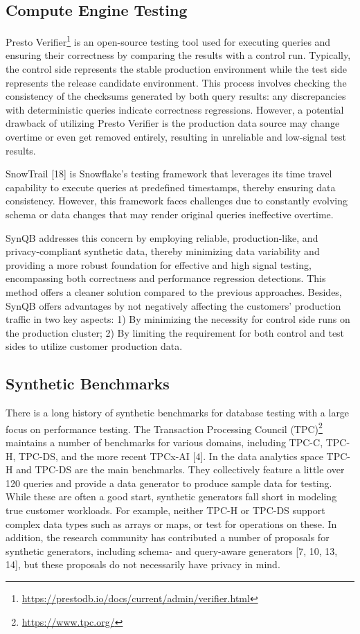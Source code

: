 \documentclass[11pt]{article}
\begin{document}
\subsection{Compute Engine Testing}
Presto Verifier\footnote{\url{https://prestodb.io/docs/current/admin/verifier.html}}
is an open-source testing tool used for executing
queries and ensuring their correctness by comparing the results
with a control run. Typically, the control side represents the stable
production environment while the test side represents the release
candidate environment. This process involves checking the consistency
of the checksums generated by both query results: any
discrepancies with deterministic queries indicate correctness regressions.
However, a potential drawback of utilizing Presto Verifier
is the production data source may change overtime or even get
removed entirely, resulting in unreliable and low-signal test results.

SnowTrail [18] is Snowflake's testing framework that leverages
its time travel capability to execute queries at predefined timestamps,
thereby ensuring data consistency. However, this framework
faces challenges due to constantly evolving schema or data changes
that may render original queries ineffective overtime.

SynQB addresses this concern by employing reliable, production-like,
and privacy-compliant synthetic data, thereby minimizing data
variability and providing a more robust foundation for effective
and high signal testing, encompassing both correctness and performance
regression detections. This method offers a cleaner solution
compared to the previous approaches. Besides, SynQB offers advantages
by not negatively affecting the customers' production traffic
in two key aspects: 1) By minimizing the necessity for control side
runs on the production cluster; 2) By limiting the requirement for
both control and test sides to utilize customer production data.

\subsection{Synthetic Benchmarks}
There is a long history of synthetic benchmarks for database testing
with a large focus on performance testing. The Transaction Processing
Council (TPC)\footnote{\url{https://www.tpc.org/}} maintains a number of benchmarks for various
domains, including TPC-C, TPC-H, TPC-DS, and the more recent
TPCx-AI [4]. In the data analytics space TPC-H and TPC-DS are the
main benchmarks. They collectively feature a little over 120 queries
and provide a data generator to produce sample data for testing.
While these are often a good start, synthetic generators fall short
in modeling true customer workloads. For example, neither TPC-H
or TPC-DS support complex data types such as arrays or maps, or
test for operations on these. In addition, the research community
has contributed a number of proposals for synthetic generators,
including schema- and query-aware generators [7, 10, 13, 14], but
these proposals do not necessarily have privacy in mind.
\end{document}
